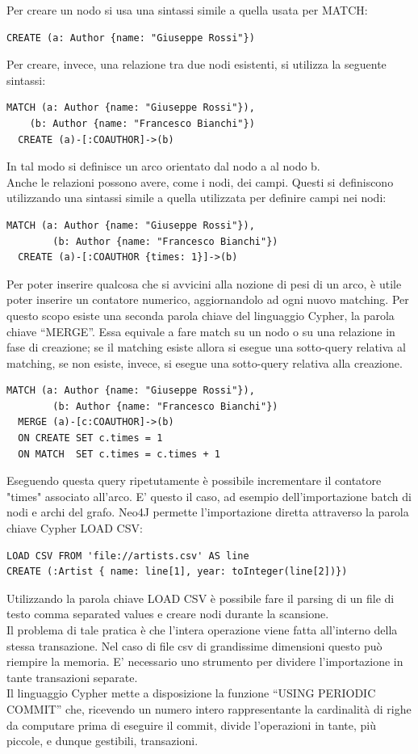\documentclass[a4paper, 12pt]{article}
\begin{document}
Per creare un nodo si usa una sintassi simile a quella usata per MATCH:
\begin{lstlisting}[keepspaces=true]
  CREATE (a: Author {name: "Giuseppe Rossi"})
\end{lstlisting}
Per creare, invece, una relazione tra due nodi esistenti, si utilizza la seguente sintassi:
\begin{lstlisting}[keepspaces=true]
  MATCH (a: Author {name: "Giuseppe Rossi"}),
    (b: Author {name: "Francesco Bianchi"})
  CREATE (a)-[:COAUTHOR]->(b)
\end{lstlisting}
In tal modo si definisce un arco orientato dal nodo a al nodo b. \\
Anche le relazioni possono avere, come i nodi, dei campi. Questi si definiscono utilizzando una sintassi simile a quella utilizzata per definire campi nei nodi:
\begin{lstlisting}[keepspaces=true]
  MATCH (a: Author {name: "Giuseppe Rossi"}),
        (b: Author {name: "Francesco Bianchi"})
  CREATE (a)-[:COAUTHOR {times: 1}]->(b)
\end{lstlisting}
Per poter inserire qualcosa che si avvicini alla nozione di pesi di un arco, è utile poter inserire un contatore numerico, aggiornandolo ad ogni nuovo matching.
Per questo scopo esiste una seconda parola chiave del linguaggio Cypher, la parola chiave ``MERGE''. Essa equivale a fare match su un nodo o su una relazione in fase di creazione; se il matching esiste allora si esegue una sotto-query relativa al matching, se non esiste, invece, si esegue una sotto-query relativa alla creazione.
\begin{lstlisting}[keepspaces=true]
  MATCH (a: Author {name: "Giuseppe Rossi"}),
        (b: Author {name: "Francesco Bianchi"})
  MERGE (a)-[c:COAUTHOR]->(b)
  ON CREATE SET c.times = 1
  ON MATCH  SET c.times = c.times + 1
\end{lstlisting}
Eseguendo questa query ripetutamente è possibile incrementare il contatore "times" associato all'arco. E' questo il caso, ad esempio dell'importazione batch di nodi e archi del grafo.
Neo4J permette l'importazione diretta attraverso la parola chiave Cypher LOAD CSV:
\begin{lstlisting}
LOAD CSV FROM 'file://artists.csv' AS line
CREATE (:Artist { name: line[1], year: toInteger(line[2])})
\end{lstlisting}
Utilizzando la parola chiave LOAD CSV è possibile fare il parsing di un file di testo comma separated values e creare nodi durante la scansione. \\
Il problema di tale pratica è che l'intera operazione viene fatta all'interno della stessa transazione. Nel caso di file csv di grandissime dimensioni questo può riempire la memoria. E' necessario uno strumento per dividere l'importazione in tante transazioni separate. \\
Il linguaggio Cypher mette a disposizione la funzione ``USING PERIODIC COMMIT'' che, ricevendo un numero intero rappresentante la cardinalità di righe da computare prima di eseguire il commit, divide l'operazioni in tante, più piccole, e dunque gestibili, transazioni.
\end{document}
